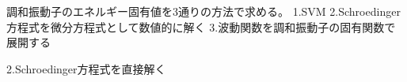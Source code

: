 \documentclass[12pt,a4paper,titlepage]{jarticle}
\begin{document}
\title{}
\author{A4SB2121 Yusa Shusaku}
\date{}

調和振動子のエネルギー固有値を3通りの方法で求める。
1.SVM
2.Schroedinger方程式を微分方程式として数値的に解く
3.波動関数を調和振動子の固有関数で展開する

2.Schroedinger方程式を直接解く
\end{document}
